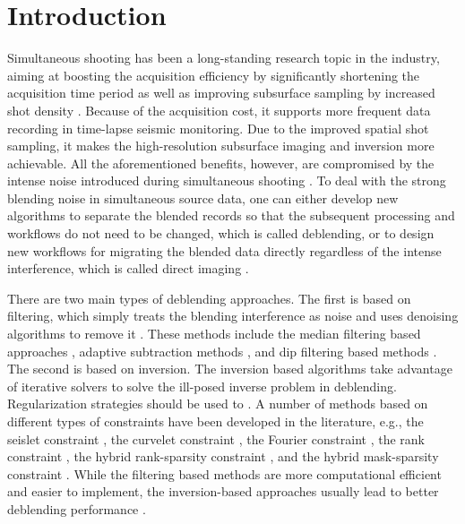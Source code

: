 \section{Introduction}
Simultaneous shooting has been a long-standing research topic in the industry, aiming at boosting the acquisition efficiency by significantly shortening the acquisition time period as well as improving subsurface sampling by increased shot density \cite[]{beasleycj2008,wapenaark2012,abma2014,amundsen2017multi,shaohuan2017jag,asgedom2017rough,zhang2017improving,kim2017efficient,wang2017building,wujuan2018jse1}. Because of the  acquisition cost, it supports more frequent data recording in time-lapse seismic monitoring. Due to the improved spatial shot sampling, it makes the high-resolution subsurface imaging and inversion more achievable.  All the aforementioned benefits, however, are compromised by the intense  noise introduced during simultaneous shooting \cite[]{panagiotis20122,arazthesis2012,qushan2014,sixuethesis2014,sixue2015,yangkang2016irr5d,yatong2018gji,baimin2018jse2,yatong2018dbi,yatong2018jse}. To deal with the strong blending noise in simultaneous source data, one can either develop new algorithms to separate the blended records so that the subsequent processing and workflows do not need to be changed, which is called deblending, or to design new workflows for migrating the blended data directly regardless of the intense interference, which is called direct imaging \cite[]{verschuur2011,shuwei2016vscan,shaohuan2017,baimin2017jse1,wujuan2018cg1,baimin2018cg,baimin2018jse1,qingchen2018gji,qingchen2018tgrs}. 

There are two main types of deblending approaches. The first is based on filtering, which simply treats the blending interference as noise and uses denoising algorithms to remove it \cite[]{mostafa2016geo,mostafa2016jag,mostafa2016bssa,mostafa2017geo}. These methods include the median filtering based approaches \cite[]{mediandeblend,yangkang2015svmf,shuwei2016,weilin2018grsl}, adaptive subtraction methods \cite[]{spitz2008,kim2009}, and dip filtering based methods \cite[]{hampson2008}.
The second is based on inversion.  The inversion based algorithms take advantage of iterative solvers to solve the ill-posed inverse problem in deblending.  Regularization strategies should be used to . A number of methods based on different types of constraints have been developed in the literature, e.g., the seislet constraint \cite[]{yangkang20142}, the curvelet constraint \cite[]{kumar2015source,qushan2016,shaohuan2016}, the Fourier constraint \cite[]{abma2015}, the rank constraint \cite[]{jinkun2016,yatong2017ieee}, the hybrid rank-sparsity constraint \cite[]{shaohuan2017gji}, and the hybrid mask-sparsity constraint \cite[]{yatong2017pocs}.  While the filtering based methods are more computational efficient and easier to implement, the inversion-based approaches usually lead to better deblending performance \cite[]{borselen2012,shaohuan2016}. 

